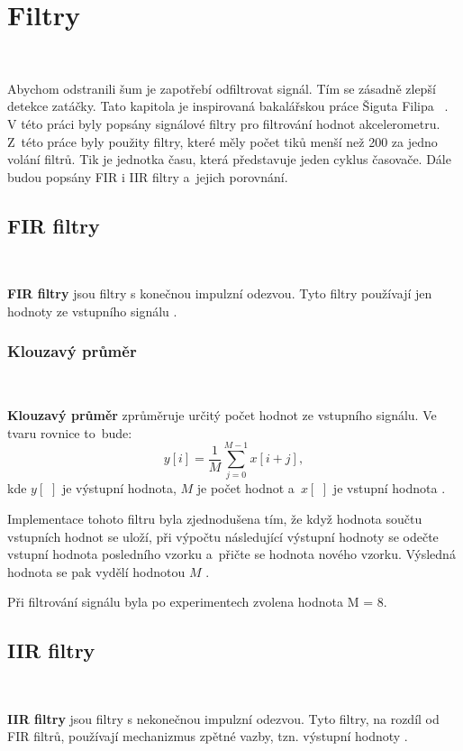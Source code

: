 \chapter{Filtry}
\label{sec:Filters}\

Abychom odstranili šum je zapotřebí odfiltrovat signál. Tím se zásadně zlepší
detekce zatáčky. Tato kapitola je inspirovaná bakalářskou práce Šiguta Filipa
~\cite{krokomer}. V této práci byly popsány 
signálové filtry pro filtrování hodnot akcelerometru. Z~této práce byly použity 
filtry, které měly počet tiků menší než 200 za jedno volání filtrů. Tik je jednotka 
času, která představuje jeden cyklus časovače. Dále budou popsány FIR i IIR filtry 
a~jejich porovnání.

\section{FIR filtry}\

\textbf{FIR filtry} jsou filtry s konečnou impulzní odezvou. Tyto filtry používají
jen hodnoty ze vstupního signálu \cite{FIR}.

\subsection{Klouzavý průměr}\

\textbf{Klouzavý průměr} zprůměruje určitý počet hodnot ze vstupního signálu. Ve
tvaru rovnice to~bude:
\begin{equation}
y[i] = \frac{1}{M}\sum_{j = 0}^{M - 1}x[i+j],
\end{equation}
kde $y[\,\,]$ je výstupní hodnota, $M$ je počet hodnot a~$x[\,\,]$ je vstupní
hodnota \cite{Filters}.

Implementace tohoto filtru byla zjednodušena tím, že když hodnota součtu vstupních
hodnot se uloží, při výpočtu následující výstupní hodnoty se odečte vstupní hodnota
posledního vzorku a~přičte se hodnota nového vzorku. Výsledná hodnota se pak vydělí
hodnotou $M$ \cite{krokomer}.

Při filtrování signálu byla po experimentech zvolena hodnota M = 8.

\section{IIR filtry}\

\textbf{IIR filtry} jsou filtry s nekonečnou impulzní odezvou. Tyto filtry, 
na rozdíl od FIR filtrů, používají mechanizmus zpětné vazby, tzn. výstupní
hodnoty \cite{IIR}.

